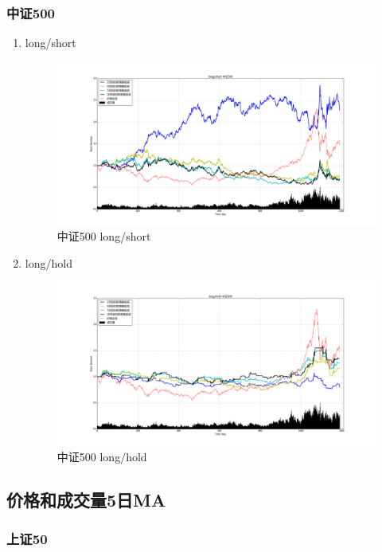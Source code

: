 \documentclass[12pt,a4paper]{article}
\begin{document}
\subsubsection{中证500}
\begin{enumerate}
\item long/short 
\begin{figure}[H]
	\centering
	\includegraphics[width=1.0\textwidth]{img_r_2/zz500.png}
	\caption{中证500 long/short }
\end{figure}
\item long/hold 
\begin{figure}[H]
	\centering
	\includegraphics[width=1.0\textwidth]{img_r_2/zz500_1.png}
	\caption{中证500 long/hold}
\end{figure}
\end{enumerate}

\subsection{价格和成交量5日MA}
\subsubsection{上证50}
\end{document}
